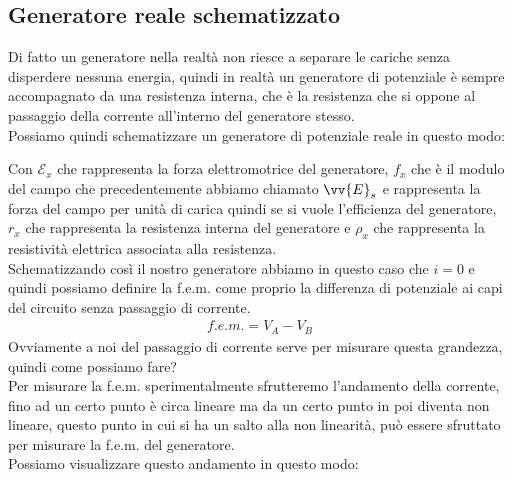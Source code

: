 \documentclass[a4paper, oneside]{article}
\begin{document}
    \subsection{Generatore reale schematizzato}
    Di fatto un generatore nella realtà non riesce a separare le cariche senza disperdere nessuna energia, quindi in realtà un generatore di potenziale è sempre accompagnato da una resistenza interna, che è la resistenza che si oppone al passaggio della corrente all'interno del generatore stesso.\\
    Possiamo quindi schematizzare un generatore di potenziale reale in questo modo:
    \begin{center}
    \end{center}
    Con $\mathcal{E}_x$ che rappresenta la forza elettromotrice del generatore, $f_x$ che è il modulo del campo che precedentemente abbiamo chiamato $\vv{E}_s$ e rappresenta la forza del campo per unità di carica quindi se si vuole l'efficienza del generatore, $r_x$ che rappresenta la resistenza interna del generatore e $\rho_x$ che rappresenta la resistività elettrica associata alla resistenza.\\
    Schematizzando così il nostro generatore abbiamo in questo caso che $i=0$ e quindi possiamo definire la f.e.m. come proprio la differenza di potenziale ai capi del circuito senza passaggio di corrente.
    \begin{gather*}
        f.e.m. = V_A - V_B
    \end{gather*}
    Ovviamente a noi del passaggio di corrente serve per misurare questa grandezza, quindi come possiamo fare?\\
    Per misurare la f.e.m. sperimentalmente sfrutteremo l'andamento della corrente, fino ad un certo punto è circa lineare 
    ma da un certo punto in poi diventa non lineare, questo punto in cui si ha un salto alla non linearità, può essere sfruttato per misurare la f.e.m. del generatore.\\
    Possiamo visualizzare questo andamento in questo modo:
    \begin{center}
    \end{center}
\end{document}
